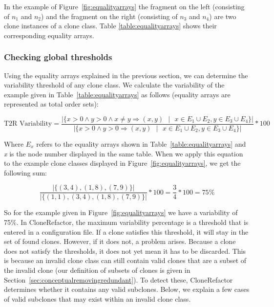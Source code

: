 In the example of Figure~\ref{fig:equalityarrays} the fragment on the left (consisting of $n_1$ and $n_2$) and the fragment on the right (consisting of $n_3$ and $n_4$) are two clone instances of a clone class. Table \ref{table:equalityarrays} shows their corresponding equality arrays.

\subsubsection{Checking global thresholds} \label{sec:t2rcheckglobalthres}
Using the equality arrays explained in the previous section, we can determine the variability threshold of any clone class. We calculate the variability of the example given in Table~\ref{table:equalityarrays} as follows (equality arrays are represented as total order sets):

\begin{equation}\label{eq:variabilityclonerefactor}
\text{T2R Variability} = \frac{|\{x>0 \land y>0 \land x \neq y \Rightarrow (x,y) \text{ }|\text{ }x \in E_1 \cup E_2, y \in E_3 \cup E_4\}|}{|\{x>0 \land y>0 \Rightarrow (x,y) \text{ }|\text{ }x \in E_1 \cup E_2, y \in E_3 \cup E_4\}|}*100
\end{equation}

Where $E_x$ refers to the equality arrays shown in Table~\ref{table:equalityarrays} and \textit{x} is the node number displayed in the same table. When we apply this equation to the example clone classes displayed in Figure~\ref{fig:equalityarrays}, we get the following sum:

\begin{equation}\label{eq:sumequality}
\frac{|\{(3,4), (1,8), (7,9)\}|}{|\{(1,1), (3,4), (1,8), (7,9)\}|}*100 = \frac{3}{4}*100 = 75\%
\end{equation}

So for the example given in Figure~\ref{fig:equalityarrays} we have a variability of 75\%. In CloneRefactor, the maximum variability percentage is a threshold that is entered in a configuration file. If a clone satisfies this threshold, it will stay in the set of found clones. However, if it does not, a problem arises. Because a clone does not satisfy the thresholds, it does not yet mean it has to be discarded. This is because an invalid clone class can still contain valid clones that are a subset of the invalid clone (our definition of subsets of clones is given in Section~\ref{sec:conceptualremovingredundant}). To detect these, CloneRefactor determines whether it contains any valid subclones. Below, we explain a few cases of valid subclones that may exist within an invalid clone class.

